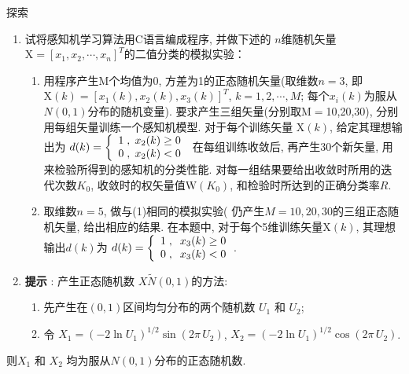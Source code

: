 \begin{custom}[explorecolor]{探索}
\begin{enumerate}
\item 试将感知机学习算法用C语言编成程序, 并做下述的 $n$维随机矢量$\mbox{X}=[x_{1} ,x_{2} ,\cdots ,x_{n} ]^{T}$的二值分类的模拟实验：
	\begin{enumerate}
	\item 用程序产生M个均值为0, 方差为1的正态随机矢量(取维数$n=3$, 即 $\mbox{X}(k)=[x_{1} (k),x_{2} (k),x_{3} (k)]^{T}$, $k=1,2,\cdots ,M$; 每个$x_{i} (k)$为服从$N(0,1)$分布的随机变量). 要求产生三组矢量(分别取M$=$10,20,30), 分别用每组矢量训练一个感知机模型. 对于每个训练矢量 $\mbox{X}(k)$, 给定其理想输出为
$d(k)=
\left\{
\begin{array}{*{20}c}
 1\;,\;x_{2}(k)\ge 0 \\
 0\;,\;x_{2}(k)<0  \\
\end{array}
\right.$
在每组训练收敛后, 再产生30个新矢量, 用来检验所得到的感知机的分类性能. 对每一组结果要给出收敛时所用的迭代次数$K_{0}$, 收敛时的权矢量值$\mbox{W}(K_{0})$, 和检验时所达到的正确分类率$R$.
	\item 取维数$n=5$, 做与(1)相同的模拟实验( 仍产生$M=10,20,30$的三组正态随机矢量, 给出相应的结果. 在本题中, 对于每个5维训练矢量$\mbox{X}(k)$, 其理想输出$d(k)$为 $d(k)=
\left\{
\begin{array}{*{20}c}
 1\;,\;\;x_{3}(k)\ge 0\\
 0\;,\;\;x_{3}(k)<0\\
\end{array} \right.$.
	\end{enumerate}
\item[\textbullet] \textbf{提示 }: 产生正态随机数 $X\tilde N(0,1)$的方法: 
	\begin{enumerate}
	\item 先产生在$(0, 1)$区间均匀分布的两个随机数 $U_{1}$ 和 $U_{2}$;
	\item 令 $X_{1} =(-2\ln U_{1} )^{1/2}\sin (2\pi \,U_{2} )$, $X_{2} =(-2\ln U_{1} )^{1/2}\cos (2\pi \,U_{2})$.
	\end{enumerate}
\end{enumerate}
则$X_{1} $ 和 $X_{2} $ 均为服从$N(0,1)$分布的正态随机数.
\end{custom}
